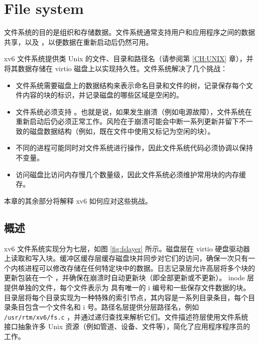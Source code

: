 \documentclass[UTF8]{article}
\begin{document}
   \chapter{File system}   
    \label{CH:FS}     

文件系统的目的是组织和存储数据。文件系统通常支持用户和应用程序之间的数据共享，以及
       ，以便数据在重新启动后仍然可用。  

xv6 文件系统提供类 Unix 的文件、目录和路径名（请参阅第    \ref{CH:UNIX}    章），并将其数据存储在 virtio 磁盘上以实现持久性。文件系统解决了几个挑战：
    \begin{itemize}

 
   \item   文件系统需要磁盘上的数据结构来表示命名目录和文件的树，记录保存每个文件内容的块的标识，并记录磁盘的哪些区域是空闲的。   \item   文件系统必须支持
        。也就是说，如果发生崩溃（例如电源故障），文件系统在重新启动后仍必须正常工作。风险在于崩溃可能会中断一系列更新并留下不一致的磁盘数据结构（例如，既在文件中使用又标记为空闲的块）。   \item   不同的进程可能同时对文件系统进行操作，因此文件系统代码必须协调以保持不变量。   \item   访问磁盘比访问内存慢几个数量级，因此文件系统必须维护常用块的内存缓存。  \end{itemize}     

本章的其余部分将解释 xv6 如何应对这些挑战。
    \section{概述  }     

xv6 文件系统实现分为七层，如图    \ref{fig:fslayer}    所示。磁盘层在 virtio 硬盘驱动器上读取和写入块。缓冲区缓存层缓存磁盘块并同步对它们的访问，确保一次只有一个内核进程可以修改存储在任何特定块中的数据。日志记录层允许高层将多个块的更新包装在一个
        ，并确保在崩溃时自动更新块（即全部更新或不更新）。 inode 层提供单独的文件，每个文件表示为
        具有唯一的 i 编号和一些保存文件数据的块。目录层将每个目录实现为一种特殊的索引节点，其内容是一系列目录条目，每个目录条目包含一个文件名和 i 号。路径名层提供分层路径名，例如
    \lstinline{/usr/rtm/xv6/fs.c}    ，并通过递归查找来解析它们。文件描述符层使用文件系统接口抽象许多 Unix 资源（例如管道、设备、文件等），简化了应用程序程序员的工作。  
\end{document}

